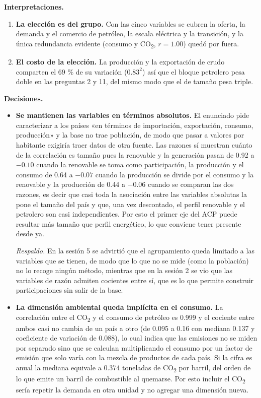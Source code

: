 \documentclass[oneside, openany, fontset=libertinus]{mitthesis}
\providecommand{\tightlist}{\setlength{\itemsep}{0pt}\setlength{\parskip}{0pt}}
\begin{document}
\begin{notas}

\textbf{Interpretaciones.}

\begin{enumerate}
\def\labelenumi{\alph{enumi}.}
\tightlist
\item
  \textbf{La elección es del grupo.} Con las cinco variables se cubren
  la oferta, la demanda y el comercio de petróleo, la escala eléctrica y
  la transición, y la única redundancia evidente (consumo y
  CO\textsubscript{2}, \(r = 1.00\)) quedó por fuera.
\item
  \textbf{El costo de la elección.} La producción y la exportación de
  crudo comparten el 69 \% de su variación (\(0.83^2\)) así que el
  bloque petrolero pesa doble en las preguntas 2 y 11, del mismo modo
  que el de tamaño pesa triple.
\end{enumerate}

\textbf{Decisiones.}

\begin{itemize}
\item
  \textbf{Se mantienen las variables en términos absolutos.} El
  enunciado pide caracterizar a los países «en términos de importación,
  exportación, consumo, producción» y la base no trae población, de modo
  que pasar a valores por habitante exigiría traer datos de otra fuente.
  Las razones sí muestran cuánto de la correlación es tamaño pues la
  renovable y la generación pasan de 0.92 a \(-0.10\) cuando la
  renovable se toma como participación, la producción y el consumo de
  0.64 a \(-0.07\) cuando la producción se divide por el consumo y la
  renovable y la producción de 0.44 a \(-0.06\) cuando se comparan las
  dos razones, es decir que casi toda la asociación entre las variables
  absolutas la pone el tamaño del país y que, una vez descontado, el
  perfil renovable y el petrolero son casi independientes. Por esto el
  primer eje del ACP puede resultar más tamaño que perfil energético, lo
  que conviene tener presente desde ya.

  \emph{Respaldo.} En la sesión 5 se advirtió que el agrupamiento queda
  limitado a las variables que se tienen, de modo que lo que no se mide
  (como la población) no lo recoge ningún método, mientras que en la
  sesión 2 se vio que las variables de razón admiten cocientes entre sí,
  que es lo que permite construir participaciones sin salir de la base.
\item
  \textbf{La dimensión ambiental queda implícita en el consumo.} La
  correlación entre el CO\textsubscript{2} y el consumo de petróleo es
  0.999 y el cociente entre ambos casi no cambia de un país a otro (de
  0.095 a 0.16 con mediana 0.137 y coeficiente de variación de 0.088),
  lo cual indica que las emisiones no se miden por separado sino que se
  calculan multiplicando el consumo por un factor de emisión que solo
  varía con la mezcla de productos de cada país. Si la cifra es anual la
  mediana equivale a 0.374 toneladas de CO\textsubscript{2} por barril,
  del orden de lo que emite un barril de combustible al quemarse. Por
  esto incluir el CO\textsubscript{2} sería repetir la demanda en otra
  unidad y no agregar una dimensión nueva.


\end{itemize}
\end{notas}
\end{document}
